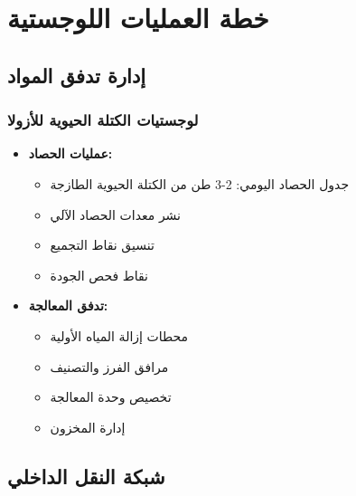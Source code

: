 \section{خطة العمليات اللوجستية}

\subsection{إدارة تدفق المواد}

\subsubsection{لوجستيات الكتلة الحيوية للأزولا}
\begin{itemize}
    \item \textbf{عمليات الحصاد:}
    \begin{itemize}
        \item جدول الحصاد اليومي: 2-3 طن من الكتلة الحيوية الطازجة
        \item نشر معدات الحصاد الآلي
        \item تنسيق نقاط التجميع
        \item نقاط فحص الجودة
    \end{itemize}
    
    \item \textbf{تدفق المعالجة:}
    \begin{itemize}
        \item محطات إزالة المياه الأولية
        \item مرافق الفرز والتصنيف
        \item تخصيص وحدة المعالجة
        \item إدارة المخزون
    \end{itemize}
\end{itemize}

\subsection{شبكة النقل الداخلي}

